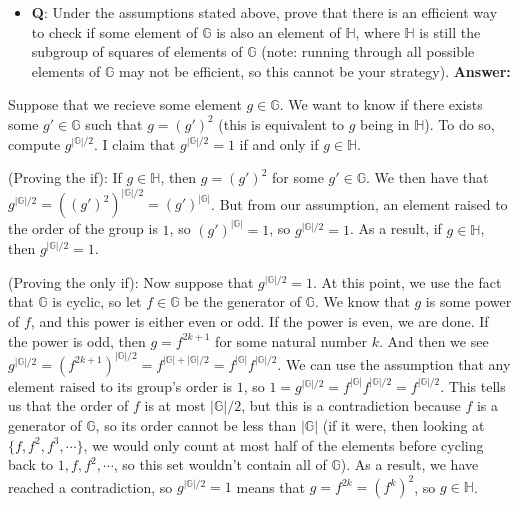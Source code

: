 \begin{itemize}
\tightlist
\item
  \textbf{Q}: Under the assumptions stated above, prove that there is an
  efficient way to check if some element of \(\mathbb{G}\) is also an
  element of \(\mathbb{H}\), where \(\mathbb{H}\) is still the subgroup
  of squares of elements of \(\mathbb{G}\) (note: running through all
  possible elements of \(\mathbb{G}\) may not be efficient, so this
  cannot be your strategy). \textbf{Answer:}
\end{itemize}

Suppose that we recieve some element \(g \in \mathbb{G}\). We want to
know if there exists some \(g' \in \mathbb{G}\) such that \(g = (g')^2\)
(this is equivalent to \(g\) being in \(\mathbb{H}\)). To do so, compute
\(g^{|\mathbb{G}|/2}\). I claim that \(g^{|\mathbb{G}|/2}=1\) if and
only if \(g \in \mathbb{H}\).

(Proving the if): If \(g \in \mathbb{H}\), then \(g=(g')^2\) for some
\(g' \in \mathbb{G}\). We then have that
\(g^{|\mathbb{G}|/2} = ((g')^2)^{|\mathbb{G}|/2} = (g')^{|\mathbb{G}|}\).
But from our assumption, an element raised to the order of the group is
\(1\), so \((g')^{|\mathbb{G}|} = 1\), so \(g^{|\mathbb{G}|/2} = 1\). As
a result, if \(g \in \mathbb{H}\), then \(g^{|\mathbb{G}|/2} = 1\).

(Proving the only if): Now suppose that \(g^{|\mathbb{G}|/2} = 1\). At
this point, we use the fact that \(\mathbb{G}\) is cyclic, so let
\(f \in \mathbb{G}\) be the generator of \(\mathbb{G}\). We know that
\(g\) is some power of \(f\), and this power is either even or odd. If
the power is even, we are done. If the power is odd, then
\(g = f^{2k+1}\) for some natural number \(k\). And then we see
\(g^{|\mathbb{G}|/2} = (f^{2k+1})^{|\mathbb{G}|/2} = f^{|\mathbb{G}| + |\mathbb{G}|/2} = f^{|\mathbb{G}|}f^{|\mathbb{G}|/2}\).
We can use the assumption that any element raised to its group's order
is \(1\), so
\(1 = g^{|\mathbb{G}|/2} = f^{|\mathbb{G}|}f^{|\mathbb{G}|/2} = f^{|\mathbb{G}|/2}\).
This tells us that the order of \(f\) is at most \(|\mathbb{G}|/2\), but
this is a contradiction because \(f\) is a generator of \(\mathbb{G}\),
so its order cannot be less than \(|\mathbb{G}|\) (if it were, then
looking at \(\{f,f^2,f^3,\cdots\}\), we would only count at most half of
the elements before cycling back to \(1,f,f^2,\cdots\), so this set
wouldn't contain all of \(\mathbb{G}\)). As a result, we have reached a
contradiction, so \(g^{|\mathbb{G}|/2} = 1\) means that
\(g = f^{2k} = (f^k)^2\), so \(g \in \mathbb{H}\).

